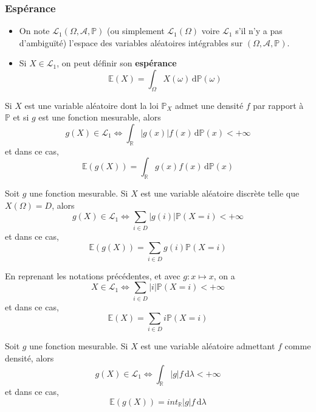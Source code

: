 	\newpage
	
	\subsubsection{Espérance}
	
	
	\begin{definition}
		\begin{itemize}
			\item On note $\mathcal{L}_1(\Omega, \mathcal{A}, \mathbb{P})$ (ou simplement $\mathcal{L}_1(\Omega)$ voire $\mathcal{L}_1$ s'il n'y a pas d'ambiguïté) l'espace des variables aléatoires intégrables sur $(\Omega, \mathcal{A}, \mathbb{P})$.
			\item Si $X \in \mathcal{L}_1$, on peut définir son \textbf{espérance}
			\[ \mathbb{E}(X) = \int_\Omega X(\omega) \, \mathrm{d}\mathbb{P}(\omega) \]
		\end{itemize}
	\end{definition}
	
	
	\begin{theorem}[Transfert]
		Si $X$ est une variable aléatoire dont la loi $\mathbb{P}_X$ admet une densité $f$ par rapport à $\mathbb{P}$ et si $g$ est une fonction mesurable, alors
		\[ g(X) \in \mathcal{L}_1 \iff \int_{\mathbb{R}} \vert g(x) \vert f(x) \, \mathrm{d}\mathbb{P}(x) < +\infty \]
		et dans ce cas,
		\[ \mathbb{E}(g(X)) = \int_{\mathbb{R}} g(x) f(x) \, \mathrm{d}\mathbb{P}(x) \]
	\end{theorem}
	
	\begin{corollary}
		Soit $g$ une fonction mesurable. Si $X$ est une variable aléatoire discrète telle que $X(\Omega) = D$, alors
		\[ g(X) \in \mathcal{L}_1 \iff \sum_{i \in D} \vert g(i) \vert \mathbb{P}(X = i) < +\infty \]
		et dans ce cas,
		\[ \mathbb{E}(g(X)) = \sum_{i \in D} g(i) \mathbb{P}(X = i) \]
	\end{corollary}
	
	\begin{remark}
		En reprenant les notations précédentes, et avec $g : x \mapsto x$, on a
		\[ X \in \mathcal{L}_1 \iff \sum_{i \in D} \vert i \vert \mathbb{P}(X = i) < +\infty \]
		et dans ce cas,
		\[ \mathbb{E}(X) = \sum_{i \in D} i \mathbb{P}(X = i) \]
	\end{remark}
	
	\begin{corollary}
		Soit $g$ une fonction mesurable. Si $X$ est une variable aléatoire admettant $f$ comme densité, alors
		\[ g(X) \in \mathcal{L}_1 \iff \int_{\mathbb{R}} \vert g \vert f \, \mathrm{d}\lambda < +\infty \]
		et dans ce cas,
		\[ \mathbb{E}(g(X)) = int_{\mathbb{R}} \vert g \vert f \, \mathrm{d}\lambda \]
	\end{corollary}
	

